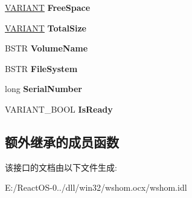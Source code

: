 \begin{DoxyCompactItemize}
\hyperlink{structtag_v_a_r_i_a_n_t}{V\+A\+R\+I\+A\+NT} {\bfseries Free\+Space}
\item 
\mbox{\label{interface_i_wsh_runtime_library_1_1_i_drive_adf400f5eda934767ed159eb91767cc72}} 
\hyperlink{structtag_v_a_r_i_a_n_t}{V\+A\+R\+I\+A\+NT} {\bfseries Total\+Size}
\item 
\mbox{\label{interface_i_wsh_runtime_library_1_1_i_drive_a100236fd7e1ccdf7e96e2cc79e806d47}} 
B\+S\+TR {\bfseries Volume\+Name}
\item 
\mbox{\label{interface_i_wsh_runtime_library_1_1_i_drive_a48773445feccf6285fdbac85a3a60089}} 
B\+S\+TR {\bfseries File\+System}
\item 
\mbox{\label{interface_i_wsh_runtime_library_1_1_i_drive_ab90bb60bfb670c128c71359cf17b4804}} 
long {\bfseries Serial\+Number}
\item 
\mbox{\label{interface_i_wsh_runtime_library_1_1_i_drive_a299fff7abcf528ec2080b45599d5fb76}} 
V\+A\+R\+I\+A\+N\+T\+\_\+\+B\+O\+OL {\bfseries Is\+Ready}
\end{DoxyCompactItemize}
\subsection*{额外继承的成员函数}


该接口的文档由以下文件生成\+:\begin{DoxyCompactItemize}
\item 
E\+:/\+React\+O\+S-\/0../dll/win32/wshom.\+ocx/wshom.\+idl\end{DoxyCompactItemize}
